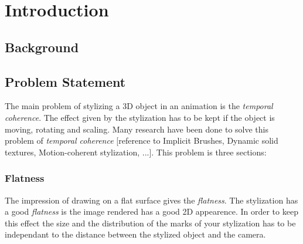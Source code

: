 \chapter{Introduction}


\section{Background}

\section{Problem Statement}

The main problem of stylizing a 3D object in an animation is the \textit{temporal coherence}. The effect given by the stylization has to be kept if the object is moving, rotating and scaling. Many research have been done to solve this problem of \textit{temporal coherence} [reference to Implicit Brushes, Dynamic solid textures, Motion-coherent stylization, ...]. This problem is three sections:

\subsection{Flatness}

The impression of drawing on a flat surface gives the \textit{flatness}. The stylization has a good \textit{flatness} is the image rendered has a good 2D appearence. In order to keep this effect the size and the distribution of the marks of your stylization has to be independant to the distance between the stylized object and the camera.
